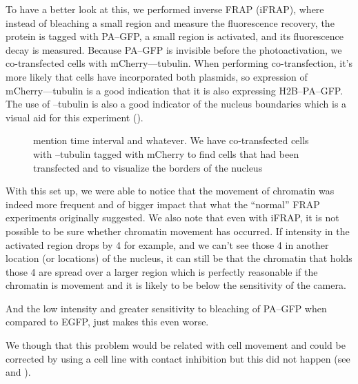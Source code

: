   To have a better look at this, we performed inverse FRAP (iFRAP), where instead of bleaching a small region
  and measure the fluorescence recovery, the protein is tagged with PA--GFP, a small region is
  activated, and its fluorescence decay is measured. Because PA--GFP is invisible before the photoactivation,
  we co-transfected cells with mCherry--\textalpha--tubulin. When performing co-transfection, it's more likely
  that cells have incorporated both plasmids, so expression of
  mCherry--\textalpha--tubulin is a good indication that it is also expressing H2B--PA--GFP. The use of
  \textalpha--tubulin is also a good indicator of the nucleus boundaries which is a visual aid for this
  experiment ().
  
  \begin{figure}
    \centering
                 {mention time interval and whatever. We have co-transfected cells with \textalpha--tubulin
                  tagged with mCherry to find cells that had been transfected and to visualize the borders
                  of the nucleus}
    \label{fig:ifrap-chromatin-movement}
  \end{figure}
  
  With this set up, we were able to notice that the movement of chromatin was indeed more frequent and of
  bigger 
  impact that what the ``normal'' FRAP experiments originally suggested. We also note that even with
  iFRAP, it is not possible to be sure whether chromatin movement has occurred. If intensity in the activated
  region drops by 4 for example, and we can't see those 4 in another location (or locations) of the nucleus,
  it can still be
  that the chromatin that holds those 4 are spread over a larger region which is perfectly reasonable if the
  chromatin is movement and it is likely to be below the sensitivity of the camera.
  
  And the low intensity and greater sensitivity to bleaching of PA--GFP when compared to EGFP, just makes this
  even worse.
  
  We though that this problem would be related with cell movement and could be
  corrected by using a cell line with contact inhibition but this did not happen (see  and
  ).

